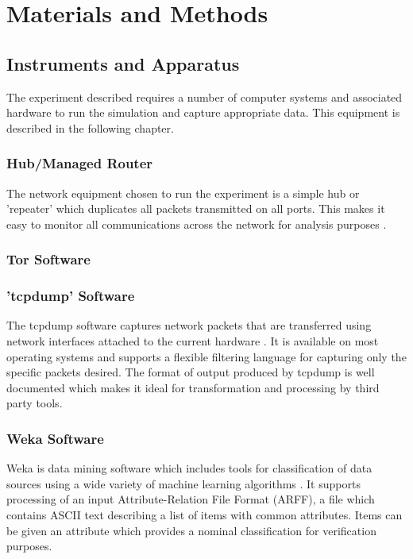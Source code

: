 
\chapter{Materials and Methods}

\section{Instruments and Apparatus}

The experiment described requires a number of computer systems and associated
hardware to run the simulation and capture appropriate data. This equipment is
described in the following chapter.

\subsection{Hub/Managed Router}

The network equipment chosen to run the experiment is a simple hub or
'repeater' which duplicates all packets transmitted on all ports. This makes it
easy to monitor all communications across the network for analysis purposes
\parencite{website:hub-reference}.

\subsection{Tor Software}

\subsection{'tcpdump' Software}

The tcpdump software captures network packets that are transferred using
network interfaces attached to the current hardware \parencite{:2009cr}.  It is
available on most operating systems and supports a flexible filtering language
for capturing only the specific packets desired. The format of output produced
by tcpdump is well documented \parencite{:nx} which makes it ideal for
transformation and processing by third party tools.

\subsection{Weka Software}

Weka is data mining software which includes tools for classification of data
sources using a wide variety of machine learning algorithms
\parencite{Hall:2009p7662}. It supports processing of an input
Attribute-Relation File Format (ARFF), a file which contains ASCII text
describing a list of items with common attributes. Items can be given an
attribute which provides a nominal classification for verification purposes.

